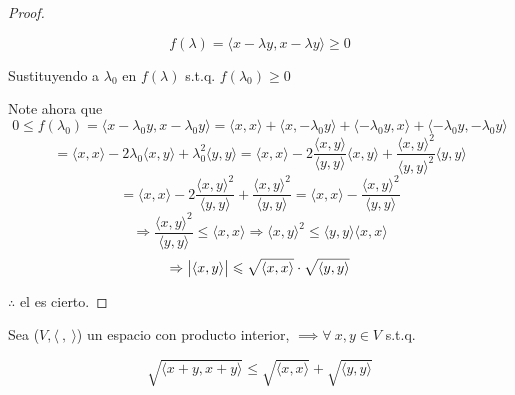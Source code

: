 \begin{proof}
\begin{enumerate}
        \begin{equation*}
            f(\lambda) = \langle x - \lambda y , x - \lambda y \rangle \geqslant 0
        \end{equation*}

        Sustituyendo a $\lambda_0$ en $f(\lambda) $ s.t.q. $f(\lambda_0) \geqslant 0 $

        Note ahora que
        \begin{equation*}
            0 \leqslant f(\lambda_0) = \langle x - \lambda_0 y , x - \lambda_0 y \rangle = \langle x , x \rangle + \langle x , - \lambda_0 y \rangle  + \langle - \lambda_0 y , x \rangle + \langle  - \lambda_0 y , - \lambda_0 y \rangle 
        \end{equation*}
        \begin{equation*}
            = \langle x , x \rangle -2 \lambda_0 \langle x , y \rangle +{\lambda}_{0}^{2} \langle y , y \rangle
            = \langle x , x \rangle -2 \frac{\langle x,y \rangle}{\langle y,y \rangle} \langle x , y \rangle +\frac{{\langle x,y \rangle}^{2}}{{\langle y,y \rangle}^{2}} \langle y , y \rangle 
        \end{equation*}
        \begin{equation*}
            = \langle x , x \rangle -2 \frac{{\langle x,y \rangle}^{2}}{\langle y,y \rangle} +\frac{{\langle x,y \rangle}^{2}}{\langle y,y \rangle} = \langle x , x \rangle - \frac{{\langle x,y \rangle}^{2}}{\langle y,y \rangle} 
        \end{equation*}
        \begin{equation*}
            \Rightarrow \frac{{\langle x,y \rangle}^{2}}{\langle y,y \rangle}  \leqslant \langle x , x \rangle \Rightarrow {\langle x,y \rangle}^{2} \leqslant \langle y,y \rangle \langle x , x \rangle 
        \end{equation*}
        \begin{equation*}
        \Rightarrow \abs{\langle x,y \rangle} \leqslant \sqrt{\langle x,x \rangle} \cdot \sqrt{\langle y,y \rangle}
    \end{equation*}
        
    \end{enumerate}

    $\therefore$ el  es cierto.
\end{proof}

\begin{theorem} \label{theom4}
    Sea ($V, \langle \: , \: \rangle$) un espacio con producto interior, $ \implies  \forall \: x,y \in V$ s.t.q.

    \begin{equation*}
        \sqrt{\langle x + y, x + y \rangle} \leqslant \sqrt{\langle x,x \rangle} + \sqrt{\langle y,y \rangle}
    \end{equation*}
\end{theorem}


